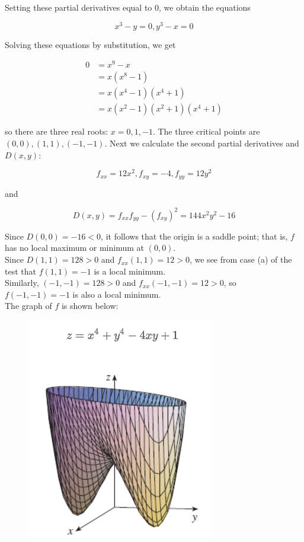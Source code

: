         Setting these partial derivatives equal to 0, we obtain the equations

        \[
            x^3 - y = 0, y^3 - x = 0
        \]

        Solving these equations by substitution, we get

        \begin{align*}
            0   &= x^9 - x \\
                &= x(x^8 - 1) \\
                &= x(x^4 - 1)(x^4 + 1) \\
                &= x(x^2 - 1)(x^2 + 1)(x^4 + 1)
        \end{align*}

        so there are three real roots: $x = 0, 1, -1$. The three critical points are $(0,0), (1,1), (-1,-1)$. Next we calculate the second partial derivatives and $D(x,y):$

        \[
            f_{xx} = 12x^2, f_{xy} = -4, f_{yy} = 12y^2
        \]

        and

        \[
            D(x,y) = f_{xx} f_{yy} - \left(f_{xy}\right)^2 = 144x^2 y^2 - 16
        \]

        Since $D(0,0) = -16 < 0$, it follows that the origin is a saddle point; that is, $f$ has no local maximum or minimum at $(0,0)$. \\
        Since $D(1,1) = 128 > 0$ and $f_{xx} (1,1) = 12 > 0$, we see from case (a) of the test that $f(1,1) = -1$ is a local minimum. \\
        Similarly, $(-1, -1) = 128 > 0$ and $f_{xx} (-1, -1) = 12 > 0$, so $f(-1, -1) = -1$ is also a local minimum. \\

        The graph of $f$ is shown below:

        \begin{figure}[hbt!]
            \centering
            \includegraphics[scale = 0.75]{Resources/14.7_Example_Graph}
        \end{figure}


